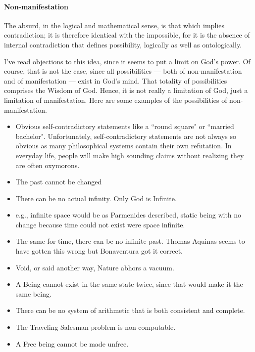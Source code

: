 \paragraph{Non-manifestation}
\begin{quotex}
The absurd, in the logical and mathematical sense, is that which implies contradiction; it is therefore identical with the impossible, for it is the absence of internal contradiction that defines possibility, logically as well as ontologically. 

\end{quotex}
I've read objections to this idea, since it seems to put a limit on God's power. Of course, that is not the case, since all possibilities — both of non-manifestation and of manifestation — exist in God's mind. That totality of possibilities comprises the Wisdom of God. Hence, it is not really a limitation of God, just a limitation of manifestation. Here are some examples of the possibilities of non-manifestation.

\begin{itemize}
\item Obvious self-contradictory statements like a ``round square" or ``married bachelor". Unfortunately, self-contradictory statements are not always so obvious as many philosophical systems contain their own refutation. In everyday life, people will make high sounding claims without realizing they are often oxymorons. 
\item The past cannot be changed 
\item There can be no actual infinity. Only God is Infinite. 
\item e.g., infinite space would be as Parmenides described, static being with no change because time could not exist were space infinite. 
\item The same for time, there can be no infinite past. Thomas Aquinas seems to have gotten this wrong but Bonaventura got it correct. 
\item Void, or said another way, Nature abhors a vacuum. 
\item A Being cannot exist in the same state twice, since that would make it the same being. 
\item There can be no system of arithmetic that is both consistent and complete. 
\item The Traveling Salesman problem is non-computable. 
\item A Free being cannot be made unfree. 
\end{itemize}
